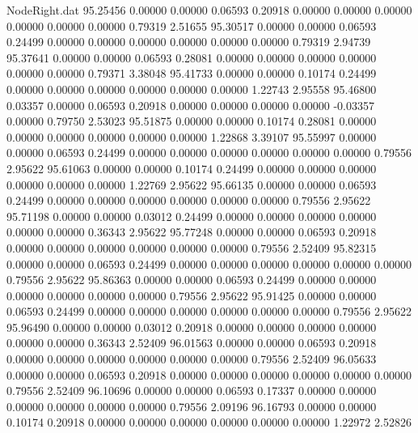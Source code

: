 \begin{filecontents}{NodeRight.dat}
  95.25456    0.00000    0.00000     0.06593    0.20918    0.00000    0.00000    0.00000    0.00000    0.00000    0.00000    0.79319    2.51655
  95.30517    0.00000    0.00000     0.06593    0.24499    0.00000    0.00000    0.00000    0.00000    0.00000    0.00000    0.79319    2.94739
  95.37641    0.00000    0.00000     0.06593    0.28081    0.00000    0.00000    0.00000    0.00000    0.00000    0.00000    0.79371    3.38048
  95.41733    0.00000    0.00000     0.10174    0.24499    0.00000    0.00000    0.00000    0.00000    0.00000    0.00000    1.22743    2.95558
  95.46800    0.03357    0.00000     0.06593    0.20918    0.00000    0.00000    0.00000    0.00000   -0.03357    0.00000    0.79750    2.53023
  95.51875    0.00000    0.00000     0.10174    0.28081    0.00000    0.00000    0.00000    0.00000    0.00000    0.00000    1.22868    3.39107
  95.55997    0.00000    0.00000     0.06593    0.24499    0.00000    0.00000    0.00000    0.00000    0.00000    0.00000    0.79556    2.95622
  95.61063    0.00000    0.00000     0.10174    0.24499    0.00000    0.00000    0.00000    0.00000    0.00000    0.00000    1.22769    2.95622
  95.66135    0.00000    0.00000     0.06593    0.24499    0.00000    0.00000    0.00000    0.00000    0.00000    0.00000    0.79556    2.95622
  95.71198    0.00000    0.00000     0.03012    0.24499    0.00000    0.00000    0.00000    0.00000    0.00000    0.00000    0.36343    2.95622
  95.77248    0.00000    0.00000     0.06593    0.20918    0.00000    0.00000    0.00000    0.00000    0.00000    0.00000    0.79556    2.52409
  95.82315    0.00000    0.00000     0.06593    0.24499    0.00000    0.00000    0.00000    0.00000    0.00000    0.00000    0.79556    2.95622
  95.86363    0.00000    0.00000     0.06593    0.24499    0.00000    0.00000    0.00000    0.00000    0.00000    0.00000    0.79556    2.95622
  95.91425    0.00000    0.00000     0.06593    0.24499    0.00000    0.00000    0.00000    0.00000    0.00000    0.00000    0.79556    2.95622
  95.96490    0.00000    0.00000     0.03012    0.20918    0.00000    0.00000    0.00000    0.00000    0.00000    0.00000    0.36343    2.52409
  96.01563    0.00000    0.00000     0.06593    0.20918    0.00000    0.00000    0.00000    0.00000    0.00000    0.00000    0.79556    2.52409
  96.05633    0.00000    0.00000     0.06593    0.20918    0.00000    0.00000    0.00000    0.00000    0.00000    0.00000    0.79556    2.52409
  96.10696    0.00000    0.00000     0.06593    0.17337    0.00000    0.00000    0.00000    0.00000    0.00000    0.00000    0.79556    2.09196
  96.16793    0.00000    0.00000     0.10174    0.20918    0.00000    0.00000    0.00000    0.00000    0.00000    0.00000    1.22972    2.52826

\end{filecontents}
